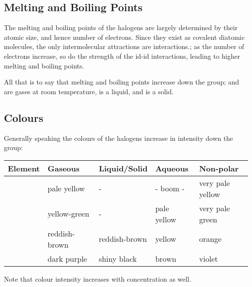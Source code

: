 		\pagebreak
		\subsection{Melting and Boiling Points}

			The melting and boiling points of the halogens are largely determined by their atomic size, and hence number of electrons. Since
			they exist as covalent diatomic molecules, the only intermolecular attractions are \idid{} interactions.; as the number of electrons
			increase, so do the strength of the id-id interactions, leading to higher melting and boiling points.

			All that is to say that melting and boiling points increase down the group;  and  are gases at room temperature,
			 is a liquid, and  is a solid.



		\subsection{Colours}

			Generally speaking the colours of the halogens increase in intensity down the group:

			\begin{table}[htb]\renewcommand{\arraystretch}{1.5}\begin{center}
			\begin{tabu} to 0.9\textwidth {X[c,m] | X[c,m] | X[c,m] | X[c,m] | X[c,m]}

				Element  &  Gaseous         &   Liquid/Solid    &   Aqueous     &   Non-polar           \\  \hline
				   &  pale yellow     &       -           &   - boom -    &   very pale yellow    \\
				\ch{\Cl} &  yellow-green    &       -           &   pale yellow &   very pale green     \\
				  &  reddish-brown   &   reddish-brown   &   yellow      &   orange              \\
				   &  dark purple     &   shiny black     &   brown       &   violet              \\

			\end{tabu}\end{center}
			\end{table}\vspace{-1em}

			Note that colour intensity increases with concentration as well.

